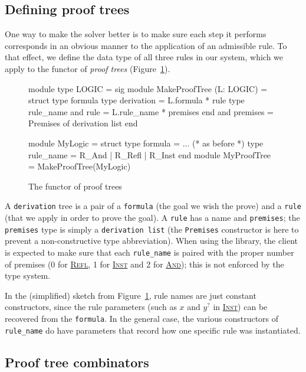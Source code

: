 \documentclass{easychair}
\def\li{\lstinline}
\let\TirName\textsc
\renewcommand{\DefTirName}[1]{\hyperlink{#1}{\TirName {#1}}}
\let\Rule\DefTirName
\newcommand{\fref}[1]{Figure~\ref{fig:#1}}
\newcommand{\f}[1]{\ensuremath{#1^?}} %
\begin{document}
\subsection{Defining proof trees}

One way to make the solver better is to make sure each step it performs
corresponds in an obvious manner to the application of an admissible rule. To
that effect, we define the data type of all three rules in our system, which we
apply to the functor of \emph{proof trees} (\fref{proof-trees}).

\begin{figure}
  \centering
\begin{ocaml}
module type LOGIC = sig     module MakeProofTree (L: LOGIC) = struct
  type formula                type derivation = L.formula * rule
  type rule_name              and rule = L.rule_name * premises
end                           and premises = Premises of derivation list
                            end 

module MyLogic = struct
  type formula = ... (* as before *)
  type rule_name = R_And | R_Refl | R_Inst
end
module MyProofTree = MakeProofTree(MyLogic)
\end{ocaml}
  \caption{The functor of proof trees}
  \label{fig:proof-trees}
\end{figure}

A \li+derivation+ tree is a pair of a \li+formula+ (the goal we wish the prove)
and a \li+rule+ (that we apply in order to prove the goal). A \li+rule+ has a name
and \li+premises+; the \li+premises+ type is simply a \li+derivation list+ (the
\li+Premises+ constructor is here to prevent a non-constructive type
abbreviation). When using the library, the client is expected to make sure
that each \li+rule_name+ is paired with the proper
number of premises (0 for \Rule{Refl}, 1 for
\Rule{Inst} and 2 for \Rule{And}); this is not enforced by the type system.

In the (simplified) sketch from \fref{proof-trees}, rule names are just constant
constructors, since the rule parameters (such as $x$ and $\f y$ in \Rule{Inst})
can be recovered from the \li+formula+. In the general case, the various
constructors of \li+rule_name+ do have parameters that record how one specific
rule was instantiated.

\subsection{Proof tree combinators}
\end{document}
